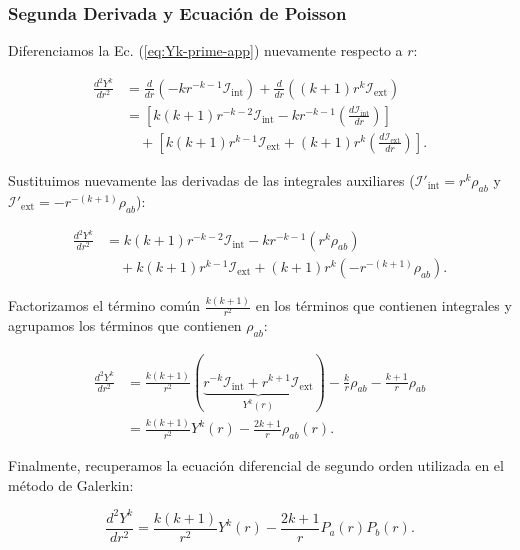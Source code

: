 \subsubsection{Segunda Derivada y Ecuación de Poisson}

Diferenciamos la Ec. (\cref{eq:Yk-prime-app}) nuevamente respecto a $r$:

\begin{align*}
    \frac{d^2Y^k}{dr^2} &= \frac{d}{dr}\left( -k r^{-k-1} \mathcal{I}_{\text{int}} \right) + \frac{d}{dr}\left( (k+1) r^k \mathcal{I}_{\text{ext}} \right) \\
    &= \left[ k(k+1) r^{-k-2} \mathcal{I}_{\text{int}} - k r^{-k-1} \left( \frac{d\mathcal{I}_{\text{int}}}{dr} \right) \right] \\
    &\quad + \left[ k(k+1) r^{k-1} \mathcal{I}_{\text{ext}} + (k+1) r^k \left( \frac{d\mathcal{I}_{\text{ext}}}{dr} \right) \right].
\end{align*}

Sustituimos nuevamente las derivadas de las integrales auxiliares ($\mathcal{I}'_{\text{int}} = r^k \rho_{ab}$ y $\mathcal{I}'_{\text{ext}} = -r^{-(k+1)} \rho_{ab}$):

\begin{align*}
    \frac{d^2Y^k}{dr^2} &= k(k+1) r^{-k-2} \mathcal{I}_{\text{int}} - k r^{-k-1} (r^k \rho_{ab}) \\
    &\quad + k(k+1) r^{k-1} \mathcal{I}_{\text{ext}} + (k+1) r^k (-r^{-(k+1)} \rho_{ab}).
\end{align*}

Factorizamos el término común $\frac{k(k+1)}{r^2}$ en los términos que contienen integrales y agrupamos los términos que contienen $\rho_{ab}$:

\begin{align*}
    \frac{d^2Y^k}{dr^2} &= \frac{k(k+1)}{r^2} \left( \underbrace{r^{-k} \mathcal{I}_{\text{int}} + r^{k+1} \mathcal{I}_{\text{ext}}}_{Y^k(r)} \right) - \frac{k}{r} \rho_{ab} - \frac{k+1}{r} \rho_{ab} \\
    &= \frac{k(k+1)}{r^2} Y^k(r) - \frac{2k+1}{r} \rho_{ab}(r).
\end{align*}

Finalmente, recuperamos la ecuación diferencial de segundo orden utilizada en el método de Galerkin:

\begin{equation}
    \frac{d^2 Y^k}{dr^2} = \frac{k(k+1)}{r^2} Y^k(r) - \frac{2k+1}{r} P_a(r)P_b(r).
\end{equation}

